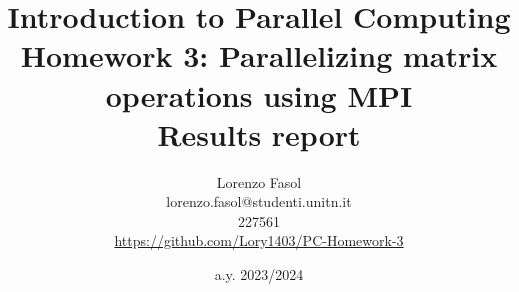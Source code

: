 \documentclass{article}
\begin{document}
    \title{
        Introduction to Parallel Computing\\
        Homework 3: Parallelizing matrix operations using MPI\\
        \textbf{Results report}
    }
    \author{
        Lorenzo Fasol\\
        lorenzo.fasol@studenti.unitn.it\\
        227561\\
        \url{https://github.com/Lory1403/PC-Homework-3}    
    }
    \date{a.y. 2023/2024}
    
    \maketitle

    

    
    

    \clearpage

    \nocite{*}
    \printbibliography
\end{document}
